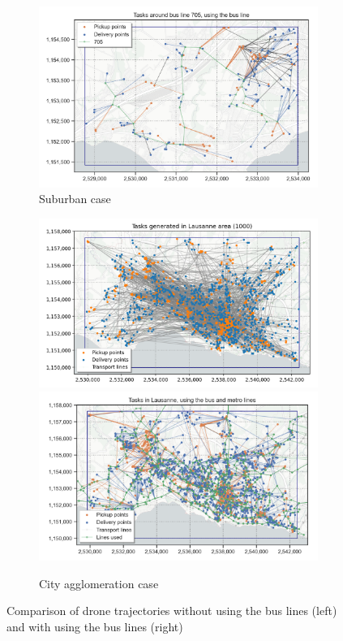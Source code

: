\begin{figure}
\begin{subfigure}{\linewidth}
        \includegraphics[width=0.49\linewidth]{../fig/l705_tasks_bus.png}
        \caption{Suburban case}        
    \end{subfigure}
    \begin{subfigure}{\linewidth}
        \includegraphics[width=0.49\linewidth]{../fig/laus_tasks1000.png}
        \includegraphics[width=0.49\linewidth]{../fig/laus_tasks1000_bus.png}
        \caption{City agglomeration case}        
    \end{subfigure}
    \caption{Comparison of drone trajectories without using the bus lines (left) and with using the bus lines (right)}
    \label{fig:results}
\end{figure}

